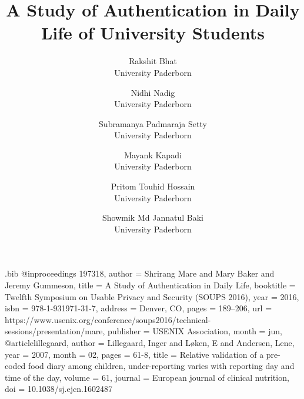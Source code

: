 \usepackage{filecontents}

\begin{filecontents}{\jobname.bib}
@inproceedings {197318,
author = {Shrirang Mare and Mary Baker and Jeremy Gummeson},
title = {A Study of Authentication in Daily Life},
booktitle = {Twelfth Symposium on Usable Privacy and Security (SOUPS 2016)},
year = {2016},
isbn = {978-1-931971-31-7},
address = {Denver, CO},
pages = {189--206},
url = {https://www.usenix.org/conference/soups2016/technical-sessions/presentation/mare},
publisher = {USENIX Association},
month = jun,
}
@article{lillegaard,
author = {Lillegaard, Inger and Løken, E and Andersen, Lene},
year = {2007},
month = {02},
pages = {61-8},
title = {Relative validation of a pre-coded food diary among children, under-reporting varies with reporting day and time of the day},
volume = {61},
journal = {European journal of clinical nutrition},
doi = {10.1038/sj.ejcn.1602487}
}
\end{filecontents}



\date{}

\title{\Large \bf A Study of Authentication in Daily Life of University Students}

\def\plainauthor{Author name(s) for PDF metadata. Don't forget to anonymize for submission!}

\author{
{\rm Rakshit Bhat}\\
University Paderborn
\and
{\rm Nidhi Nadig}\\
University Paderborn
\and
{\rm Subramanya Padmaraja Setty}\\
University Paderborn
\and
{\rm Mayank Kapadi}\\
University Paderborn
\and
{\rm Pritom Touhid Hossain}\\
University Paderborn
\and
{\rm Showmik Md Jannatul Baki}\\
University Paderborn
} %

